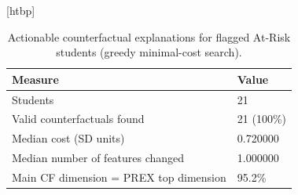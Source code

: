\begin{table}
\small[htbp]
\caption{Actionable counterfactual explanations for flagged At-Risk students (greedy minimal-cost search).}
\label{tab:S13_counterfactual_summary}
\begin{tabular}{ll}
\toprule
Measure & Value \\
\midrule
Students & 21 \\
Valid counterfactuals found & 21 (100\%) \\
Median cost (SD units) & 0.720000 \\
Median number of features changed & 1.000000 \\
Main CF dimension = PREX top dimension & 95.2\% \\
\bottomrule
\end{tabular}
\end{table}
